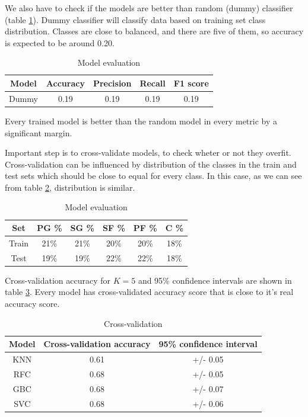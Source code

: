 \documentclass[a4paper]{article}
\begin{document}
We also have to check if the models are better than random (dummy) classifier (table \ref{tab:pos_clf_dummy}). Dummy classifier will classify data based on training set class distribution. Classes are close to balanced, and there are five of them, so accuracy is expected to be around 0.20.

\begin{table}[!h]
\begin{center}
\begin{tabular}{|c|c|c|c|c|} \hline
Model & Accuracy & Precision & Recall & F1 score \\ \hline
Dummy & 0.19 & 0.19 & 0.19 & 0.19 \\ \hline
\end{tabular}
\caption{Model evaluation}
\label{tab:pos_clf_dummy}
\end{center}
\end{table}

Every trained model is better than the random model in every metric by a significant margin.

Important step is to cross-validate models, to check wheter or not they overfit. Cross-validation can be influenced by distribution of the classes in the train and test sets which should be close to equal for every class. In this case, as we can see from table \ref{tab:pos_clf_cross_val}, distribution is similar.

\begin{table}[!h]
\begin{center}
\begin{tabular}{|c|c|c|c|c|c|} \hline
Set & PG \% & SG \% & SF \% & PF \% & C \% \\ \hline
Train & 21\% & 21\% & 20\% & 20\%  & 18\% \\ \hline
Test & 19\% & 19\% & 22\% & 22\% & 18\% \\ \hline
\end{tabular}
\caption{Model evaluation}
\label{tab:pos_clf_cross_val}
\end{center}
\end{table}

Cross-validation accuracy for $K = 5$ and 95\% confidence intervals are shown in table \ref{tab:pos_clf_cross_val_eval}. Every model has cross-validated accuracy score that is close to it's real accuracy score.

\begin{table}[!h]
\begin{center}
\begin{tabular}{|c|c|c|} \hline
Model & Cross-validation accuracy & 95\% confidence interval \\ \hline
KNN & 0.61 & +/- 0.05 \\ \hline
RFC & 0.68 & +/- 0.05 \\ \hline
GBC & 0.68 & +/- 0.07 \\ \hline
SVC & 0.68 & +/- 0.06 \\ \hline
\end{tabular}
\caption{Cross-validation}
\label{tab:pos_clf_cross_val_eval}
\end{center}
\end{table}
\end{document}
